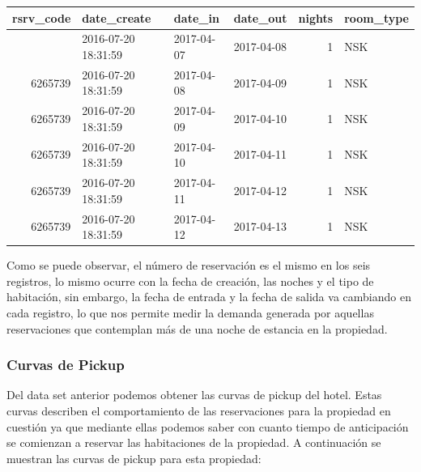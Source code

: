 \begin{knitrout}
\color{fgcolor}\begin{table}[H]
\centering{}

\begin{tabular}{r|l|l|l|r|l}
\hiderowcolors
\hline
rsrv\_code & date\_create & date\_in & date\_out & nights & room\_type\\
\hline
\showrowcolors
6265739 & 2016-07-20 18:31:59 & 2017-04-07 & 2017-04-08 & 1 & NSK\\
\hline
6265739 & 2016-07-20 18:31:59 & 2017-04-08 & 2017-04-09 & 1 & NSK\\
\hline
6265739 & 2016-07-20 18:31:59 & 2017-04-09 & 2017-04-10 & 1 & NSK\\
\hline
6265739 & 2016-07-20 18:31:59 & 2017-04-10 & 2017-04-11 & 1 & NSK\\
\hline
6265739 & 2016-07-20 18:31:59 & 2017-04-11 & 2017-04-12 & 1 & NSK\\
\hline
6265739 & 2016-07-20 18:31:59 & 2017-04-12 & 2017-04-13 & 1 & NSK\\
\hline
\end{tabular}
\end{table}
\end{knitrout}

Como se puede observar, el número de reservación es el mismo en los seis registros, lo mismo ocurre con la fecha de creación, las noches y el tipo de habitación, sin embargo, la fecha de entrada y la fecha de salida va cambiando en cada registro, lo que nos permite medir la demanda generada por aquellas reservaciones que contemplan más de una noche de estancia en la propiedad. 

\subsubsection*{Curvas de Pickup}

Del data set anterior podemos obtener las curvas de pickup del hotel. Estas curvas describen el comportamiento de las reservaciones para la propiedad en cuestión ya que mediante ellas podemos saber con cuanto tiempo de anticipación se comienzan a reservar las habitaciones de la propiedad. A continuación se muestran las curvas de pickup para esta propiedad:

